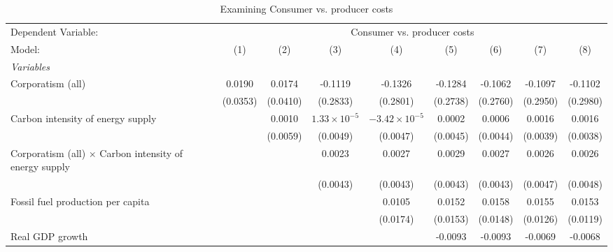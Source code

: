 
\begin{table}[htbp]
   \caption{Examining Consumer vs. producer costs}
   \centering
   \begin{tabular}{lcccccccc}
      \tabularnewline \midrule \midrule
      Dependent Variable: & \multicolumn{8}{c}{Consumer vs. producer costs}\\
      Model:                                                        & (1)      & (2)      & (3)                   & (4)                    & (5)      & (6)      & (7)      & (8)\\  
      \midrule
      \emph{Variables}\\
      Corporatism (all)                                             & 0.0190   & 0.0174   & -0.1119               & -0.1326                & -0.1284  & -0.1062  & -0.1097  & -0.1102\\   
                                                                    & (0.0353) & (0.0410) & (0.2833)              & (0.2801)               & (0.2738) & (0.2760) & (0.2950) & (0.2980)\\   
      Carbon intensity of energy supply                             &          & 0.0010   & $1.33\times 10^{-5}$  & $-3.42\times 10^{-5}$  & 0.0002   & 0.0006   & 0.0016   & 0.0016\\   
                                                                    &          & (0.0059) & (0.0049)              & (0.0047)               & (0.0045) & (0.0044) & (0.0039) & (0.0038)\\   
      Corporatism (all) $\times$ Carbon intensity of energy supply  &          &          & 0.0023                & 0.0027                 & 0.0029   & 0.0027   & 0.0026   & 0.0026\\   
                                                                    &          &          & (0.0043)              & (0.0043)               & (0.0043) & (0.0043) & (0.0047) & (0.0048)\\   
      Fossil fuel production per capita                             &          &          &                       & 0.0105                 & 0.0152   & 0.0158   & 0.0155   & 0.0153\\   
                                                                    &          &          &                       & (0.0174)               & (0.0153) & (0.0148) & (0.0126) & (0.0119)\\   
      Real GDP growth                                               &          &          &                       &                        & -0.0093  & -0.0093  & -0.0069  & -0.0068\\   

\end{tabular}
\end{table}
